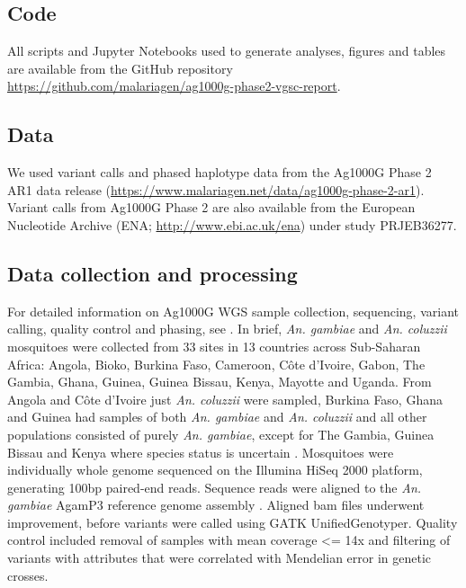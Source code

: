 \documentclass[a4paper,11pt,abstracton,hidelinks]{scrartcl}
\begin{document}
\subsection*{Code}

%
All scripts and Jupyter Notebooks used to generate analyses, figures and tables are available from the GitHub repository \url{https://github.com/malariagen/ag1000g-phase2-vgsc-report}.


\subsection*{Data}

%
We used variant calls and phased haplotype data from the Ag1000G Phase 2 AR1 data release (\url{https://www.malariagen.net/data/ag1000g-phase-2-ar1}).
%
Variant calls from Ag1000G Phase 2 are also available from the European Nucleotide Archive (ENA; \url{http://www.ebi.ac.uk/ena}) under study PRJEB36277.


\subsection*{Data collection and processing}

%
For detailed information on Ag1000G WGS sample collection, sequencing, variant calling, quality control and phasing, see \cite{Ag1000gConsortium2017, clarkson2019genome}.
%
In brief, \emph{An. gambiae} and \emph{An. coluzzii} mosquitoes were collected from 33 sites in 13 countries across Sub-Saharan Africa: Angola, Bioko, Burkina Faso, Cameroon, C\^{o}te d'Ivoire, Gabon, The Gambia, Ghana, Guinea, Guinea Bissau, Kenya, Mayotte and Uganda.
%
From Angola and C\^{o}te d'Ivoire just \emph{An. coluzzii} were sampled, Burkina Faso, Ghana and Guinea had samples of both \emph{An. gambiae} and \emph{An. coluzzii} and all other populations consisted of purely \emph{An. gambiae}, except for The Gambia, Guinea Bissau and Kenya where species status is uncertain \cite{clarkson2019genome}.
%
Mosquitoes were individually whole genome sequenced on the Illumina HiSeq 2000 platform, generating 100bp paired-end reads.
%
Sequence reads were aligned to the \emph{An. gambiae} AgamP3 reference genome assembly \cite{Holt2002}.
%
Aligned bam files underwent improvement, before variants were called using GATK UnifiedGenotyper.
%
Quality control included removal of samples with mean coverage <= 14x and filtering of variants with attributes that were correlated with Mendelian error in genetic crosses.
\end{document}
